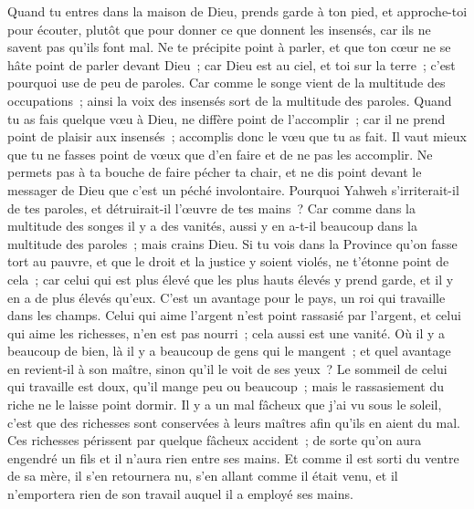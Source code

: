 \begin{multicols}{2}
Quand tu entres dans la maison de Dieu, prends garde à ton pied, et approche-toi pour écouter, plutôt que pour donner ce que donnent les insensés, car ils ne savent pas qu'ils font mal.
\VerseOne{}Ne te précipite point à parler, et que ton cœur ne se hâte point de parler devant Dieu~; car Dieu est au ciel, et toi sur la terre~; c'est pourquoi use de peu de paroles.
Car comme le songe vient de la multitude des occupations~; ainsi la voix des insensés sort de la multitude des paroles.
Quand tu as fais quelque vœu à Dieu, ne diffère point de l'accomplir~; car il ne prend point de plaisir aux insensés~; accomplis donc le vœu que tu as fait.
Il vaut mieux que tu ne fasses point de vœux que d'en faire et de ne pas les accomplir.
Ne permets pas à ta bouche de faire pécher ta chair, et ne dis point devant le messager de Dieu que c'est un péché involontaire. Pourquoi Yahweh s'irriterait-il de tes paroles, et détruirait-il l'œuvre de tes mains~?
Car comme dans la multitude des songes il y a des vanités, aussi y en a-t-il beaucoup dans la multitude des paroles~; mais crains Dieu.
Si tu vois dans la Province qu'on fasse tort au pauvre, et que le droit et la justice y soient violés, ne t'étonne point de cela~; car celui qui est plus élevé que les plus hauts élevés y prend garde, et il y en a de plus élevés qu'eux.
C'est un avantage pour le pays, un roi qui travaille dans les champs.
Celui qui aime l'argent n'est point rassasié par l'argent, et celui qui aime les richesses, n'en est pas nourri~; cela aussi est une vanité. 
Où il y a beaucoup de bien, là il y a beaucoup de gens qui le mangent~; et quel avantage en revient-il à son maître, sinon qu'il le voit de ses yeux~? 
Le sommeil de celui qui travaille est doux, qu'il mange peu ou beaucoup~; mais le rassasiement du riche ne le laisse point dormir. 
Il y a un mal fâcheux que j'ai vu sous le soleil, c'est que des richesses sont conservées à leurs maîtres afin qu'ils en aient du mal. 
Ces richesses périssent par quelque fâcheux accident~; de sorte qu'on aura engendré un fils et il n'aura rien entre ses mains.
Et comme il est sorti du ventre de sa mère, il s'en retournera nu, s'en allant comme il était venu, et il n'emportera rien de son travail auquel il a employé ses mains.

\end{multicols}
